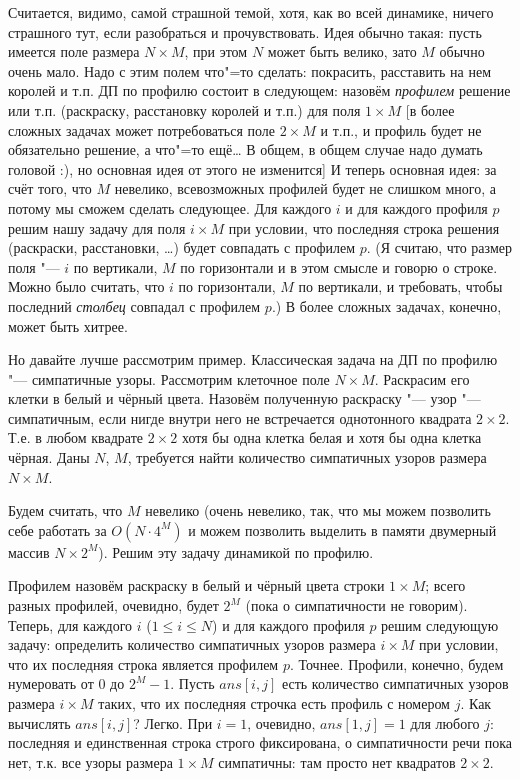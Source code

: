  Считается, видимо, самой страшной темой, хотя, как во всей динамике, ничего страшного тут,
если разобраться и прочувствовать. Идея обычно такая: пусть имеется поле размера $N\times M$, при этом $N$ может быть
велико, зато $M$ обычно очень мало. Надо с этим полем что"=то сделать: покрасить, расставить на нем королей и т.п.
ДП по профилю состоит в следующем: назовём \textit{профилем} решение или т.п. (раскраску, расстановку королей и т.п.) 
для поля $1\times M$ [{\small в более сложных задачах может потребоваться поле $2\times M$ и т.п., и профиль будет не обязательно 
решение, а что"=то ещё\dots{} В общем, в общем случае надо думать головой :), но основная идея от этого не изменится}]
И теперь основная идея: за счёт того, что $M$ невелико, всевозможных профилей будет не слишком много, а потому мы сможем сделать следующее.
Для каждого $i$ и для каждого профиля $p$ решим нашу задачу для поля $i\times M$ при условии, что последняя строка
решения (раскраски, расстановки, \dots) будет совпадать с профилем $p$. (Я считаю, что размер поля "--- $i$ по вертикали,
$M$ по горизонтали и в этом смысле и говорю о строке. Можно было считать, что $i$ по горизонтали, $M$ по вертикали,
и требовать, чтобы последний \textit{столбец} совпадал с профилем $p$.) В более сложных задачах, конечно, может быть хитрее.

Но давайте лучше рассмотрим пример. Классическая задача на ДП по профилю "--- симпатичные узоры. Рассмотрим клеточное
поле $N\times M$. Раскрасим его клетки в белый и чёрный цвета. Назовём полученную раскраску "--- узор "--- симпатичным,
если нигде внутри него не встречается однотонного квадрата $2\times 2$. Т.е. в любом квадрате $2\times 2$ хотя бы одна клетка
белая и хотя бы одна клетка чёрная. Даны $N$, $M$, требуется найти количество симпатичных узоров размера $N\times M$.

Будем считать, что $M$ невелико (очень невелико, так, что мы можем позволить себе работать за $O(N\cdot 4^M)$ и можем
позволить выделить в памяти двумерный массив $N\times 2^M$). Решим эту задачу динамикой по профилю.

Профилем назовём раскраску в белый и чёрный цвета строки $1\times M$; всего разных профилей, очевидно, будет $2^M$ (пока
о симпатичности не говорим). Теперь, для каждого $i$ ($1\leq i \leq N$) и для каждого профиля $p$ решим следующую
задачу: определить количество симпатичных узоров размера $i\times M$ при условии, что их последняя строка является
профилем $p$. Точнее. Профили, конечно, будем нумеровать от 0 до $2^M-1$. Пусть $ans[i,j]$ есть количество симпатичных узоров
размера $i\times M$ таких, что их последняя строчка есть профиль с номером $j$. Как вычислять $ans[i,j]$? Легко.
При $i=1$, очевидно, $ans[1,j]=1$ для любого $j$: последняя и единственная строка строго фиксирована, о симпатичности
речи пока нет, т.к. все узоры размера $1\times M$ симпатичны: там просто нет квадратов $2\times 2$.


